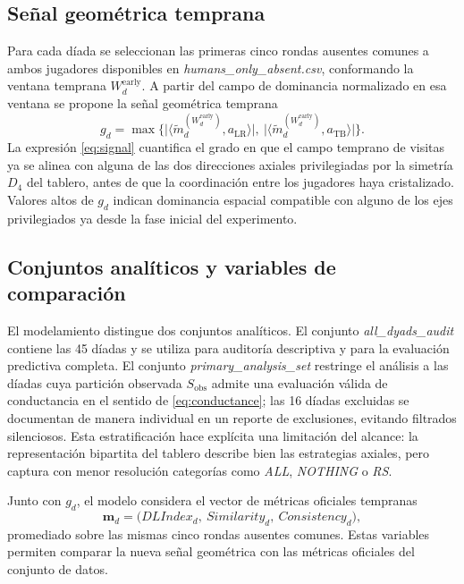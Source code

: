 \documentclass[journal]{IEEEtran}
\newcommand{\Sobs}{S_{\mathrm{obs}}}
\begin{document}
\subsection{Señal geométrica temprana}

Para cada díada se seleccionan las primeras cinco rondas ausentes comunes a ambos jugadores disponibles en \emph{humans\_only\_absent.csv}, conformando la ventana temprana $W_d^{\mathrm{early}}$. A partir del campo de dominancia normalizado en esa ventana se propone la señal geométrica temprana
\begin{equation}
g_d = \max \bigl\{
\bigl|\langle \tilde m_d^{(W_d^{\mathrm{early}})}, a_{\mathrm{LR}} \rangle\bigr|,\
\bigl|\langle \tilde m_d^{(W_d^{\mathrm{early}})}, a_{\mathrm{TB}} \rangle\bigr|
\bigr\}.
\label{eq:signal}
\end{equation}
La expresión \eqref{eq:signal} cuantifica el grado en que el campo temprano de visitas ya se alinea con alguna de las dos direcciones axiales privilegiadas por la simetría $D_4$ del tablero, antes de que la coordinación entre los jugadores haya cristalizado. Valores altos de $g_d$ indican dominancia espacial compatible con alguno de los ejes privilegiados ya desde la fase inicial del experimento.

\subsection{Conjuntos analíticos y variables de comparación}

El modelamiento distingue dos conjuntos analíticos. El conjunto \emph{all\_dyads\_audit} contiene las 45 díadas y se utiliza para auditoría descriptiva y para la evaluación predictiva completa. El conjunto \emph{primary\_analysis\_set} restringe el análisis a las díadas cuya partición observada $\Sobs$ admite una evaluación válida de conductancia en el sentido de \eqref{eq:conductance}; las 16 díadas excluidas se documentan de manera individual en un reporte de exclusiones, evitando filtrados silenciosos. Esta estratificación hace explícita una limitación del alcance: la representación bipartita del tablero describe bien las estrategias axiales, pero captura con menor resolución categorías como \emph{ALL}, \emph{NOTHING} o \emph{RS}.

Junto con $g_d$, el modelo considera el vector de métricas oficiales tempranas
\[
\mathbf{m}_d = \bigl(DLIndex_d,\ Similarity_d,\ Consistency_d\bigr),
\]
promediado sobre las mismas cinco rondas ausentes comunes. Estas variables permiten comparar la nueva señal geométrica con las métricas oficiales del conjunto de datos.
\end{document}
